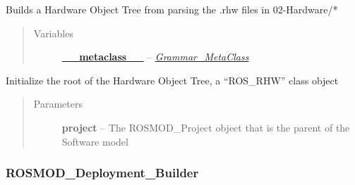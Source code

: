 \documentclass[letterpaper,10pt,english]{sphinxmanual}
\begin{document}
\begin{fulllineitems}
\label{class_Hardware_Builder:ROSMOD_Hardware_Builder}
Builds a Hardware Object Tree from parsing the .rhw files in 02-Hardware/*
\begin{quote}\begin{description}
\item[{Variables}] \leavevmode
\href{http://docs.python.org/reference/datamodel.html\#\_\_metaclass\_\_}{\textbf{\_\_metaclass\_\_}} -- {\hyperref[class_Grammar_MetaClass:id1]{\emph{Grammar\_MetaClass}}}

\end{description}\end{quote}

\begin{fulllineitems}
\label{class_Hardware_Builder:ROSMOD_Hardware_Builder.__init__}
Initialize the root of the Hardware Object Tree, a ``ROS\_RHW'' class object
\begin{quote}\begin{description}
\item[{Parameters}] \leavevmode
\textbf{project} -- The ROSMOD\_Project object that is the parent of the Software model

\end{description}\end{quote}

\end{fulllineitems}


\end{fulllineitems}



\subsubsection{ROSMOD\_Deployment\_Builder}
\label{class_Deployment_Builder::doc}\label{class_Deployment_Builder:rosmod-deployment-builder}
\end{document}
